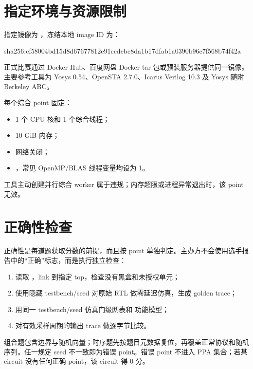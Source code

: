 \documentclass[UTF8,a4paper,11pt,fontset=fandol]{ctexart}
\begin{document}
\section{指定环境与资源限制}

指定镜像为 ，冻结本地 image ID 为：

\begin{codebox}
sha256:cf58004bd15d8d67677812e91ccdebe8da1b17dfab1a0390b96c7f568b74f42a
\end{codebox}

正式比赛通过 Docker Hub、百度网盘 Docker tar 包或预装服务器提供同一镜像。主要参考工具为 Yosys 0.54、OpenSTA 2.7.0、Icarus Verilog 10.3 及 Yosys 随附 Berkeley ABC。

每个综合 point 固定：

\begin{itemize}
  \item 1 个 CPU 核和 1 个综合线程；
  \item 10 GiB 内存；
  \item 网络关闭；
  \item {}，常见 OpenMP/BLAS 线程变量均设为 1。
\end{itemize}

工具主动创建并行综合 worker 属于违规；内存超限或进程异常退出时，该 point 无效。

\section{正确性检查}

正确性是每道题获取分数的前提，而且按 point 单独判定。主办方不会使用选手报告中的“正确”标志，而是执行独立检查：

\begin{enumerate}
  \item 读取 ，link 到指定 top，检查没有黑盒和未授权单元；
  \item 使用隐藏 testbench/seed 对原始 RTL 做零延迟仿真，生成 golden trace；
  \item 用同一 testbench/seed 仿真门级网表和  功能模型；
  \item 对有效采样周期的输出 trace 做逐字节比较。
\end{enumerate}

组合题包含边界与随机向量；时序题先按题目元数据复位，再覆盖正常协议和随机序列。任一规定 seed 不一致即为错误 point。错误 point 不进入 PPA 集合；若某 circuit 没有任何正确 point，该 circuit 得 0 分。
\end{document}
